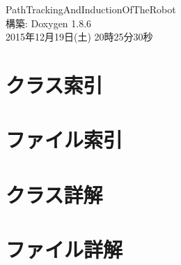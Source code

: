 \documentclass[twoside]{book}
\newcommand{\clearemptydoublepage}{%
  \newpage{\pagestyle{empty}\cleardoublepage}%
}
\begin{document}
\begin{titlepage}
\vspace*{7cm}
\begin{center}%
{\Large Path\-Tracking\-And\-Induction\-Of\-The\-Robot }\\
\vspace*{1cm}
{\large 構築\-: Doxygen 1.8.6}\\
\vspace*{0.5cm}
{\small 2015年12月19日(土) 20時25分30秒}\\
\end{center}
\end{titlepage}
\clearemptydoublepage
\tableofcontents
\clearemptydoublepage
{}

\chapter{クラス索引}

\chapter{ファイル索引}

\chapter{クラス詳解}











\chapter{ファイル詳解}




















\newpage
{}
{}
\printindex
\end{document}
